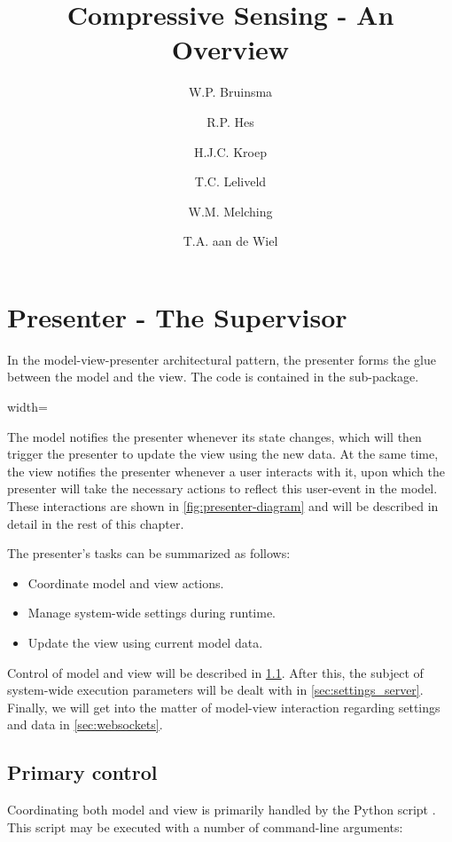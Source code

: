 \documentclass[a4paper, openany, oneside]{memoir}
\title{Compressive Sensing - An Overview}
\author{W.P. Bruinsma \and R.P. Hes \and H.J.C. Kroep \and T.C. Leliveld \and W.M. Melching \and T.A. aan de Wiel}
\begin{document}
\chapter{Presenter - The Supervisor}
\label{cha:presenter}
In the model-view-presenter architectural pattern, the presenter forms the glue between the model and the view. The code is contained in the  sub-package.
\begin{figure*}[h]
    \centering
    \begin{adjustbox}{width=\textwidth}
    
    \end{adjustbox}
    \caption{The presenter and the central role it fulfils in the system}
    \label{fig:presenter-diagram}
\end{figure*}

The model notifies the presenter whenever its state changes, which will then trigger the presenter to update the view using the new data. At the same time, the view notifies the presenter whenever a user interacts with it, upon which the presenter will take the necessary actions to reflect this user-event in the model. These interactions are shown in \cref{fig:presenter-diagram} and will be described in detail in the rest of this chapter.

The presenter's tasks can be summarized as follows:
\begin{itemize}
	\item Coordinate model and view actions.
	\item Manage system-wide settings during runtime.
	\item Update the view using current model data.
\end{itemize}

Control of model and view will be described in \cref{sec:control}. After this, the subject of system-wide execution parameters will be dealt with in \cref{sec:settings_server}. Finally, we will get into the matter of model-view interaction regarding settings and data in \cref{sec:websockets}.

\section{Primary control}
\label{sec:control}
Coordinating both model and view is primarily handled by the Python script . This script may be executed with a number of command-line arguments:
\end{document}
